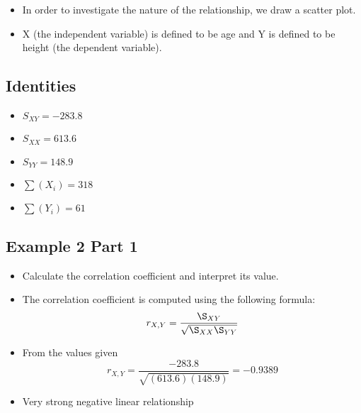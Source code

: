 \documentclass[]{report}
\begin{document}
\begin{itemize}
	\item In order to investigate the nature of the relationship, we draw a
	scatter plot.
	\item X (the independent variable) is defined to be age and Y is defined
	to be height (the dependent variable).
\end{itemize}



\subsection{Identities}
\begin{itemize}
	\item $S_{XY} = -283.8$
	\item $S_{XX} = 613.6$
	\item $S_{YY} = 148.9$
	\item $\sum(X_i)  = 318 $
	\item $\sum(Y_i)  = 61$
\end{itemize}



\subsection{Example 2 Part 1}

\begin{itemize}
	\item Calculate the correlation coefficient and interpret its value.
	\item The correlation coefficient is computed using the following formula:
	\[ r_{X,Y} = \frac{\S_{XY}}{\sqrt{\S_{XX}\S_{YY}}} \]
	\item From the values given
	\[ r_{X,Y} = \frac{-283.8}{\sqrt{(613.6)(148.9)}} = -0.9389 \]
	\item Very strong negative linear relationship
\end{itemize}
\end{document}
